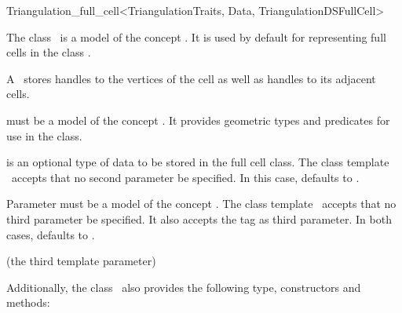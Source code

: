 \begin{ccRefClass}{Triangulation_full_cell<TriangulationTraits, Data, TriangulationDSFullCell>}

\ccDefinition

The class \ccRefName\ is a model of the concept . It
is used by default for representing full cells in the class
.

A \ccRefName\ stores handles to the vertices of the cell as well as handles
to its adjacent cells.


\ccParameters

 must be a model of the concept . It
provides geometric types and predicates for use in the
 class.

 is an optional type of data to be stored in the full cell class. The
class template \ccRefName\ accepts that no second parameter be specified. In
this case,  defaults to .

Parameter  must be a model of the concept
.
The class template \ccRefName\ accepts that no third parameter be specified.
It also accepts the tag  as third parameter. In both
cases,  defaults to .

\ccInheritsFrom

 (the third template parameter)

\ccIsModel


Additionally, the class \ccRefName\ also provides the following type,
constructors and methods:

\ccTypes


\ccCreation
{}



\end{ccRefClass}
